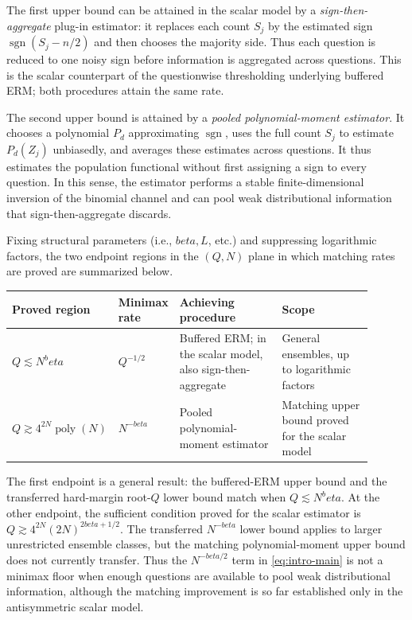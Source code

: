\documentclass[11pt]{article}
\def\beta{beta}%
\newcommand{\sgn}{\operatorname{sgn}}
\begin{document}
The first upper bound can be attained in the scalar model by a \emph{sign-then-aggregate} plug-in estimator: it replaces each count $S_j$ by the estimated sign $\sgn(S_j-n/2)$ and then chooses the majority side.  Thus each question is reduced to one noisy sign before information is aggregated across questions.  This is the scalar counterpart of the questionwise thresholding underlying buffered ERM; both procedures attain the same rate. %

The second upper bound is attained by a \emph{pooled polynomial-moment estimator}.  It chooses a polynomial $P_d$ approximating $\sgn$, uses the full count $S_j$ to estimate $P_d(Z_j)$ unbiasedly, and averages these estimates across questions.  It thus estimates the population functional without first assigning a sign to every question.  In this sense, the estimator performs a stable finite-dimensional inversion of the binomial channel and can pool weak distributional information that sign-then-aggregate discards.

Fixing structural parameters (i.e., $\beta, L$, etc.) and suppressing logarithmic factors, the two endpoint regions in the $(Q,N)$ plane in which matching rates are proved are summarized below.
\begin{center}
\small
\begin{tabular}{@{}L{0.18\linewidth}L{0.14\linewidth}L{0.31\linewidth}L{0.27\linewidth}@{}}
\toprule
Proved region & Minimax rate & Achieving procedure & Scope \\
\midrule
$Q\lesssim N^\beta$
& $Q^{-1/2}$
& Buffered ERM; in the scalar model, also sign-then-aggregate
& General ensembles, up to logarithmic factors \\
$Q\gtrsim 4^{2N}\operatorname{poly}(N)$
& $N^{-\beta}$
& Pooled polynomial-moment estimator
& Matching upper bound proved for the scalar model \\
\bottomrule
\end{tabular}
\end{center}
The first endpoint is a general result: the buffered-ERM upper bound and the transferred hard-margin root-$Q$ lower bound match when $Q\lesssim N^\beta$.  At the other endpoint, the sufficient condition proved for the scalar estimator is $Q\gtrsim 4^{2N}(2N)^{2\beta+1/2}$.  The transferred $N^{-\beta}$ lower bound applies to larger unrestricted ensemble classes, but the matching polynomial-moment upper bound does not currently transfer.  Thus the $N^{-\beta/2}$ term in \eqref{eq:intro-main} is not a minimax floor when enough questions are available to pool weak distributional information, although the matching improvement is so far established only in the antisymmetric scalar model.
\end{document}
